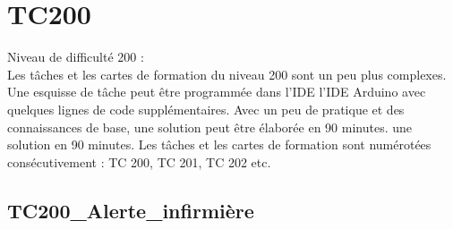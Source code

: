 \documentclass[a4paper,12pt]{report}
\begin{document}
\section{TC200}

Niveau de difficulté 200 :\\

Les tâches et les cartes de formation du niveau 200 sont un peu plus complexes. Une esquisse de tâche peut être programmée dans l'IDE l'IDE Arduino avec quelques lignes de code supplémentaires. Avec un peu de pratique et des connaissances de base, une solution peut être élaborée en 90 minutes. une solution en 90 minutes. Les tâches et les cartes de formation sont numérotées consécutivement : TC 200, TC 201, TC 202 etc.

\newpage
\subsection{TC200\_Alerte\_infirmière}
\begin{center}
\label{}
\end{center}
\end{document}
